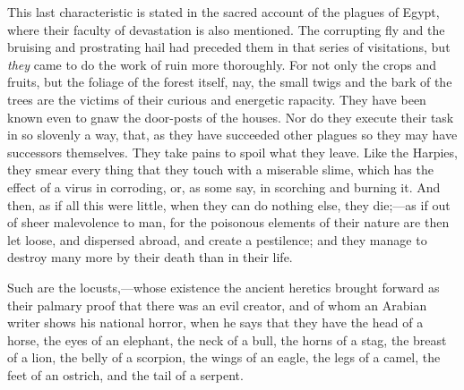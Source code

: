 This last characteristic is stated in the sacred account of the
plagues of Egypt, where their faculty of devastation is also
mentioned. The corrupting fly and the bruising and prostrating hail
had preceded them in that series of visitations, but \emph{they} came
to do the work of ruin more thoroughly. For not only the crops and
fruits, but the foliage of the forest itself, nay, the small twigs and
the bark of the trees are the victims of their curious and energetic
rapacity. They have been known even to gnaw the door-posts of the
houses. Nor do they execute their task in so slovenly a way, that, as
they have succeeded other plagues so they may have successors
themselves. They take pains to spoil what they leave. Like the
Harpies, they smear every thing that they touch with a miserable
slime, which has the effect of a virus in corroding, or, as some say,
in scorching and burning it. And then, as if all this were little,
when they can do nothing else, they die;—as if out of sheer
malevolence to man, for the poisonous elements of their nature are
then let loose, and dispersed abroad, and create a pestilence; and
they manage to destroy many more by their death than in their
life.

Such are the locusts,—whose existence the ancient heretics
brought forward as their palmary proof that there was an evil creator,
and of whom an Arabian writer shows his national horror, when he says
that they have the head of a horse, the eyes of an elephant, the neck
of a bull, the horns of a stag, the breast of a lion, the belly of a
scorpion, the wings of an eagle, the legs of a camel, the feet of an
ostrich, and the tail of a serpent.

